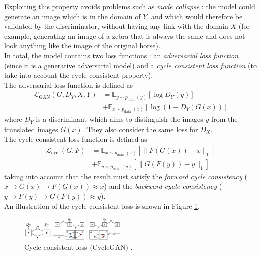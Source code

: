 \documentclass[twocolumn,superscriptaddress,aps, floatfix]{revtex4-1}
\begin{document}
    Exploiting this property avoids problems such as \emph{mode collapse} : the model could generate an image which is in the domain of $Y$, and which would therefore be validated by the discriminator, without having any link with the domain $X$ (for example, generating an image of a zebra that is always the same and does not look anything like the image of the original horse).\\
    
    In total, the model contains two loss functions : an \emph{adversarial loss function} (since it is a generative adversarial model) and a \emph{cycle consistent loss function} (to take into account the cycle consistent property).\\
    
    The adversarial loss function is defined as
    \begin{align}
        \mathcal{L}_{\mathrm{GAN}}\left(G, D_{Y}, X, Y\right)&=\mathbb{E}_{y \sim p_{\text {data }}(y)}\left[\log D_{Y}(y)\right]\nonumber\\
        &+\mathbb{E}_{x \sim p_{\text {data }}(x)}\left[\log \left(1-D_{Y}(G(x))\right]\right.
    \end{align}
    where $D_Y$ is a discriminant which aims to distinguish the images ${y}$ from the translated images ${G(x)}$. They also consider the same loss for $D_X$.\\
    
    The cycle consistent loss function is defined as
    \begin{align}
        \mathcal{L}_{\text {cyc }}(G, F) &=\mathbb{E}_{x \sim p_{\text {data }}(x)}\left[\|F(G(x))-x\|_{1}\right]\nonumber\\
        &+\mathbb{E}_{y \sim p_{\text {data }}(y)}\left[\|G(F(y))-y\|_{1}\right]
    \end{align}
    taking into account that the result must satisfy the \emph{forward cycle consistency} ($x\rightarrow G(x)\rightarrow F(G(x))\approx x$) and the \emph{backward cycle consistency} ($y\rightarrow F(y)\rightarrow G(F(y))\approx y$).\\
    
    An illustration of the cycle consistent loss is shown in Figure \ref{fig:methods.cyclegan.cycleconsistentloss}.\\
    
    \begin{figure}[ht]
        \centering
        \includegraphics[width=0.45\textwidth]{resources/png/cycle-consistent-loss.png}
        \caption{Cycle consistent loss (CycleGAN) \cite{DBLP:journals/corr/ZhuPIE17}.}
        \label{fig:methods.cyclegan.cycleconsistentloss}
    \end{figure}
    
\end{document}

